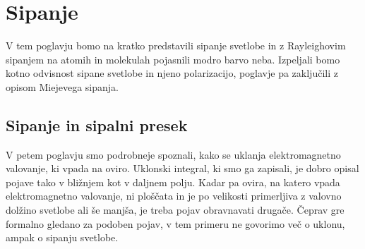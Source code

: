 
\chapter{Sipanje}
V tem poglavju bomo na kratko predstavili sipanje svetlobe in z Rayleighovim
sipanjem na atomih in molekulah pojasnili modro barvo neba. Izpeljali bomo 
kotno odvisnost sipane svetlobe in njeno polarizacijo, poglavje pa zaključili
z opisom Miejevega sipanja.

\section{Sipanje in sipalni presek}
V petem poglavju smo podrobneje spoznali, kako se uklanja elektromagnetno 
valovanje, ki vpada na oviro. Uklonski integral, ki smo ga zapisali,
je dobro opisal pojave tako v bližnjem kot v daljnem polju. Kadar pa ovira,
na katero vpada elektromagnetno valovanje, ni ploščata in je 
po velikosti primerljiva z valovno dolžino svetlobe ali še manjša, je treba 
pojav obravnavati drugače. Čeprav gre formalno gledano za podoben pojav,
v tem primeru ne govorimo več o uklonu, ampak o sipanju svetlobe.

